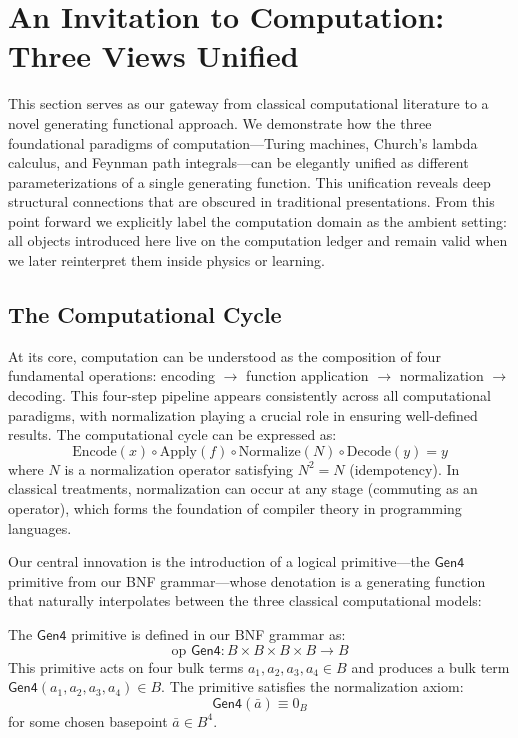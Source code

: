 \section{An Invitation to Computation: Three Views Unified}
\label{sec:computation-paradigms}

This section serves as our gateway from classical computational literature to a novel generating functional approach. We demonstrate how the three foundational paradigms of computation—Turing machines, Church's lambda calculus, and Feynman path integrals—can be elegantly unified as different parameterizations of a single generating function. This unification reveals deep structural connections that are obscured in traditional presentations. From this point forward we explicitly label the computation domain as the ambient setting: all objects introduced here live on the computation ledger and remain valid when we later reinterpret them inside physics or learning.

\subsection{The Computational Cycle}

At its core, computation can be understood as the composition of four fundamental operations: encoding $\to$ function application $\to$ normalization $\to$ decoding. This four-step pipeline appears consistently across all computational paradigms, with normalization playing a crucial role in ensuring well-defined results. The computational cycle can be expressed as:
\[
\text{Encode}(x) \circ \text{Apply}(f) \circ \text{Normalize}(N) \circ \text{Decode}(y) = y
\]
where $N$ is a normalization operator satisfying $N^2 = N$ (idempotency). In classical treatments, normalization can occur at any stage (commuting as an operator), which forms the foundation of compiler theory in programming languages.

Our central innovation is the introduction of a logical primitive—the $\mathsf{Gen4}$ primitive from our BNF grammar—whose denotation is a generating function that naturally interpolates between the three classical computational models:

\begin{definition}
\label{def:g6-primitive}
The $\mathsf{Gen4}$ primitive is defined in our BNF grammar as:
\[
\text{op } \mathsf{Gen4} : B \times B \times B \times B \to B
\]
This primitive acts on four bulk terms $a_1, a_2, a_3, a_4 \in B$ and produces a bulk term $\mathsf{Gen4}(a_1, a_2, a_3, a_4) \in B$. The primitive satisfies the normalization axiom:
\[
\mathsf{Gen4}(\bar{a}) \equiv 0_B
\]
for some chosen basepoint $\bar{a} \in B^4$.
\end{definition}

